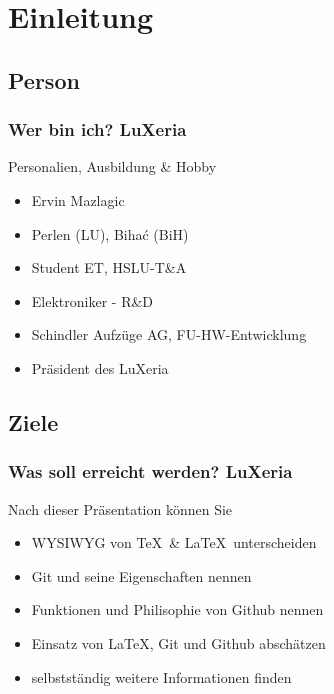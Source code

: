 \section{Einleitung}

\subsection{Person}
\begin{frame}
	\frametitle{Wer bin ich? \hfill{} \footnotesize{LuXeria}}
	\begin{block}{Personalien, Ausbildung \& Hobby}
		\begin{itemize}
			\item Ervin Mazlagic
			\item Perlen (LU), Biha\'c (BiH)
			\item Student ET, HSLU-T\&A
			\item Elektroniker - R\&D
			\item Schindler Aufzüge AG, FU-HW-Entwicklung
			\item Präsident des LuXeria
		\end{itemize}
	\end{block}
\end{frame}

\subsection{Ziele}
\begin{frame}
	\frametitle{Was soll erreicht werden? \hfill{} \footnotesize{LuXeria}}
	\begin{block}{Nach dieser Präsentation können Sie}
		\begin{itemize}
			\item WYSIWYG von \TeX~\& \LaTeX~unterscheiden
			\item Git und seine Eigenschaften nennen
			\item Funktionen und Philisophie von Github nennen
			\item Einsatz von \LaTeX, Git und Github abschätzen
			\item selbstständig weitere Informationen finden
		\end{itemize}
	\end{block}
\end{frame}

